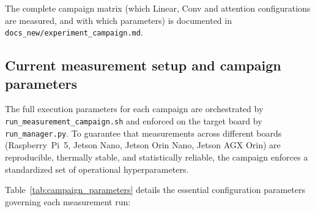 The complete campaign matrix (which Linear, Conv and attention
configurations are measured, and with which parameters) is documented in
\texttt{docs\_new/experiment\_campaign.md}.

\subsection{Current measurement setup and campaign parameters}
\label{subsec:campaign_setup}

The full execution parameters for each campaign are orchestrated by \texttt{run\_}\allowbreak\texttt{measurement\_}\allowbreak\texttt{campaign.sh} and enforced on the target board by \texttt{run\_manager.py}. To guarantee that measurements across different boards (Raspberry~Pi~5, Jetson Nano, Jetson Orin Nano, Jetson AGX Orin) are reproducible, thermally stable, and statistically reliable, the campaign enforces a standardized set of operational hyperparameters.

Table~\ref{tab:campaign_parameters} details the essential configuration parameters governing each measurement run:

